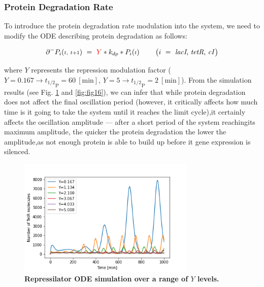 \documentclass[runningheads,a4paper]{llncs}
\begin{document}
\subsubsection*{Protein Degradation Rate}
To introduce the protein degradation rate modulation into the system, we need to modify the ODE describing protein degradation as follows:

\begin{equation*}
    \partial^{-}P_{i}({\scriptstyle t,\ t+1})\ =\ \textcolor{red}{Y}*k_{dp}*{P_{i}({\scriptstyle t})}
    \hspace{0.8cm}
    \big(i\ =\ \textrm{\textit{lacI}, \textit{tetR}, \textit{cI}}\big)
\end{equation*}

\noindent where $Y$ represents the repression modulation factor ($Y = 0.167 \rightarrow {t_{1/2}}_{\textrm{P}} = 60\ [\textrm{min}]$, $Y = 5 \rightarrow {t_{1/2}}_{\textrm{P}} = 2\ [\textrm{min}]$). From the simulation results (see Fig. \ref{fig:fig15} and \ref{fig:fig16}), we can infer that while protein degradation does not affect the final oscillation period (however, it critically affects how much time is it going to take the system until it reaches the limit cycle),\linebreak it certainly affects the oscillation amplitude --- after a short period of the system reaching\linebreak its maximum amplitude, the quicker the protein degradation the lower the amplitude,\linebreak as not enough protein is able to build up before it gene expression is silenced.

\begin{figure}
    \singlespacing
    \centering
    \includegraphics[width=0.75\textwidth]{suplementary_information_and_code/Task5_figure3.png}
    \caption{\textbf{Repressilator ODE simulation over a range of $Y$ levels.}}
    \label{fig:fig15}
\end{figure}
\end{document}
